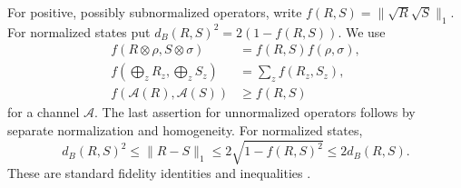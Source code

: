 For positive, possibly subnormalized operators, write
$f(R,S)=\|\sqrt R\sqrt S\|_1$.  For normalized states put
$d_B(R,S)^2=2(1-f(R,S))$.  We use
\begin{equation}\label{eq:rootrules88}
\begin{split}
 f(R\otimes\rho,S\otimes\sigma)&=f(R,S)f(\rho,\sigma),\\
 f\left(\bigoplus_zR_z,\bigoplus_zS_z\right)&=\sum_z f(R_z,S_z),\\
 f(\mathcal A(R),\mathcal A(S))&\ge f(R,S)
\end{split}
\end{equation}
for a channel $\mathcal A$.  The last assertion for unnormalized
operators follows by separate normalization and homogeneity.
For normalized states,
\begin{equation}\label{eq:tracebures88}
 d_B(R,S)^2\le\|R-S\|_1
 \le2\sqrt{1-f(R,S)^2}\le2d_B(R,S).
\end{equation}
These are standard fidelity identities and inequalities
\cite[Chapter~3]{Watrous65}.


